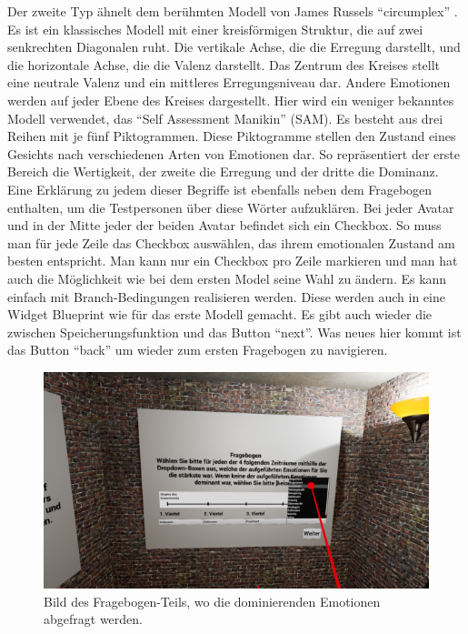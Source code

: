 Der zweite Typ {\"a}hnelt dem ber{\"u}hmten Modell von James Russels ``circumplex'' \cite{russel_1980}. Es ist ein klassisches Modell mit einer kreisf{\"o}rmigen Struktur, die auf zwei senkrechten Diagonalen ruht. Die vertikale Achse, die die Erregung darstellt, und die horizontale Achse, die die Valenz darstellt. Das Zentrum des Kreises stellt eine neutrale Valenz und ein mittleres Erregungsniveau dar. Andere Emotionen werden auf jeder Ebene des Kreises dargestellt.  Hier wird ein weniger bekanntes Modell verwendet, das ``Self Assessment Manikin'' (SAM). Es besteht aus drei Reihen mit je f{\"u}nf Piktogrammen. Diese Piktogramme stellen den Zustand eines Gesichts nach verschiedenen Arten von Emotionen dar. So repr{\"a}sentiert der erste Bereich die Wertigkeit, der zweite die Erregung und der dritte die Dominanz. Eine Erkl{\"a}rung zu jedem dieser Begriffe ist ebenfalls neben dem Fragebogen enthalten, um die Testpersonen {\"u}ber diese W{\"o}rter aufzukl{\"a}ren.  Bei jeder Avatar und in der Mitte jeder der beiden Avatar befindet sich ein Checkbox.  So muss man f{\"u}r jede Zeile das Checkbox ausw{\"a}hlen, das ihrem emotionalen Zustand am besten entspricht. Man kann nur ein Checkbox pro Zeile markieren und man hat auch die M{\"o}glichkeit wie bei dem ersten Model seine Wahl zu {\"a}ndern. Es kann einfach mit Branch-Bedingungen realisieren werden.  Diese werden auch in eine Widget Blueprint wie f{\"u}r das erste Modell gemacht. Es gibt auch wieder die zwischen Speicherungsfunktion und das Button ``next''. Was neues hier kommt ist das Button ``back'' um wieder zum ersten Fragebogen zu navigieren. 



\begin{figure}[H] \centering
\includegraphics[width=\textwidth]{Images/Fragebogen_1.png} 
\caption{ Bild des Fragebogen-Teils, wo die dominierenden Emotionen abgefragt werden. } 
\label{fig:fragenbogen1} \end{figure}
